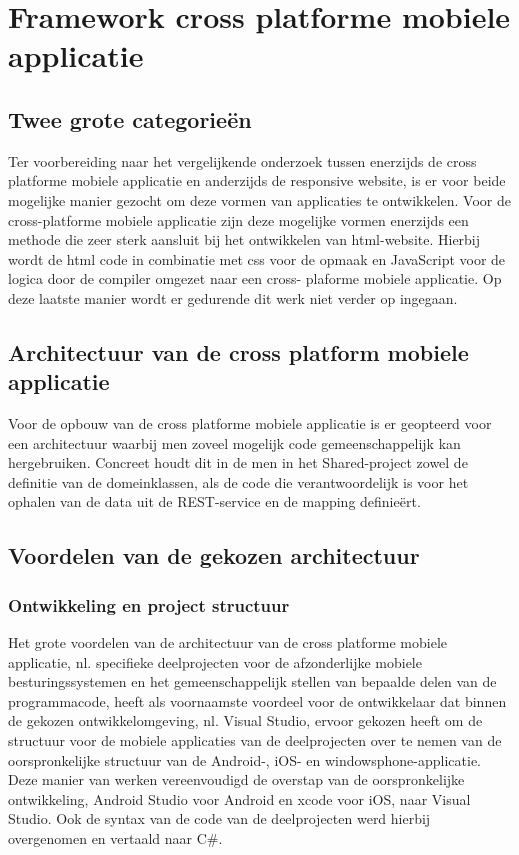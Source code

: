 \chapter{Framework cross platforme mobiele applicatie}
\label{ch:frameworkcrossplatformapp}
\section{Twee grote categorieën}
Ter voorbereiding naar het vergelijkende onderzoek tussen enerzijds de cross platforme mobiele applicatie en anderzijds de
responsive website, is er voor beide mogelijke manier gezocht om deze vormen van applicaties te ontwikkelen. Voor de cross-platforme
mobiele applicatie zijn deze mogelijke vormen enerzijds een methode die zeer sterk aansluit bij het ontwikkelen van html-website.
Hierbij wordt de html code in combinatie met css voor de opmaak en JavaScript voor de logica door de compiler omgezet naar een cross-
plaforme mobiele applicatie. Op deze laatste manier wordt er gedurende dit werk niet verder op ingegaan.

\label{sec:architectuurvandecrossplatformemobieleapplicatie}
\section{Architectuur van de cross platform mobiele applicatie}
Voor de opbouw van de cross platforme mobiele applicatie is er geopteerd voor een architectuur waarbij men zoveel mogelijk
code gemeenschappelijk kan hergebruiken. Concreet houdt dit in de men in het Shared-project zowel de definitie van de domeinklassen,
als de code die verantwoordelijk is voor het ophalen van de data uit de REST-service en de mapping definieërt.

\label{sec:voordelenvandegekozenarchitectuur}
\section{Voordelen van de gekozen architectuur}
\subsection{Ontwikkeling en project structuur}
Het grote voordelen van de architectuur van de cross platforme mobiele applicatie, nl. specifieke deelprojecten voor de afzonderlijke
mobiele besturingssystemen en het gemeenschappelijk stellen van bepaalde delen van de programmacode, heeft als voornaamste voordeel
voor de ontwikkelaar dat binnen de gekozen ontwikkelomgeving, nl. Visual Studio, ervoor gekozen heeft om de structuur voor de
mobiele applicaties van de deelprojecten over te nemen van de oorspronkelijke structuur van de Android-, iOS- en windowsphone-applicatie.
Deze manier van werken vereenvoudigd de overstap van de oorspronkelijke ontwikkeling, Android Studio voor Android en xcode voor iOS, naar Visual Studio.
Ook de syntax van de code van de deelprojecten werd hierbij overgenomen en vertaald naar C\#.
